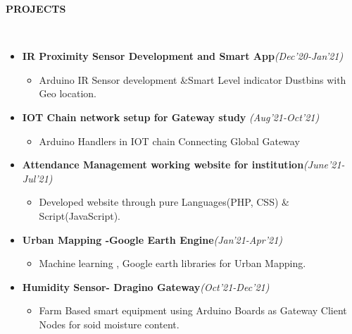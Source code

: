 \documentclass[a4paper,10pt]{article}
\newcommand{\resheading}[1]{{\small \colorbox{mygrey}{\begin{minipage}{0.99\textwidth}{\textbf{#1 \vphantom{p\^{E}}}}\end{minipage}}}}
\begin{document}
\noindent
\resheading{\textbf{PROJECTS} }\\[-0.3cm]
\begin{itemize}
\item \textbf{IR Proximity Sensor Development and Smart App}\hfill \emph{(Dec'20-Jan'21)} 
\begin{itemize}
    \item Arduino IR Sensor development \&Smart Level indicator Dustbins with Geo location.
\end{itemize}

\item \textbf{IOT Chain network setup for Gateway study}
\hfill \emph{(Aug’21-Oct'21)}
\begin{itemize}
    \item Arduino Handlers in IOT chain Connecting Global Gateway
\end{itemize}
    
\item \textbf{Attendance Management working website for institution}\hfill \emph{(June’21-Jul'21)} 
\begin{itemize}
    \item Developed website through pure Languages(PHP, CSS) \& Script(JavaScript).
\end{itemize}

\item \textbf{Urban Mapping -Google Earth Engine}\hfill \emph{(Jan'21-Apr'21)}
\begin{itemize}
    \item Machine learning , Google earth libraries for Urban Mapping.
\end{itemize}

\item \textbf{Humidity Sensor- Dragino Gateway}\hfill \emph{(Oct'21-Dec'21)}
\begin{itemize}
    \item Farm Based smart equipment using Arduino Boards as Gateway Client Nodes for soid moisture content.
\end{itemize}

\end{itemize}
\end{document}
